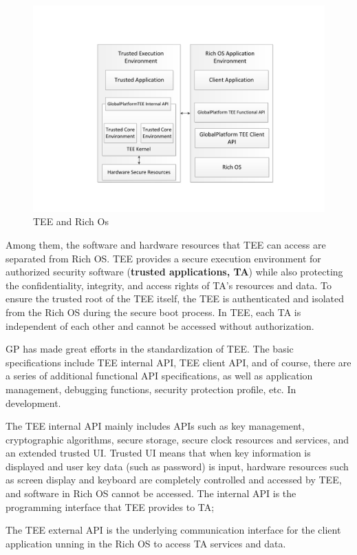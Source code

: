 \documentclass[journal]{IEEEtran}
\begin{document}
\begin{figure}[htbp]
\centerline{\includegraphics[scale=0.5]{TEE.pdf}}
\caption{TEE and Rich Os}
\label{fig}
\end{figure}

Among them, the software and hardware resources that TEE can access are separated from Rich OS. TEE provides a secure execution environment for authorized security software (\textbf{trusted applications, TA}) while also protecting the confidentiality, integrity, and access rights of TA's resources and data. To ensure the trusted root of the TEE itself, the TEE is authenticated and isolated from the Rich OS during the secure boot process. In TEE, each TA is independent of each other and cannot be accessed without authorization.

GP has made great efforts in the standardization of TEE. The basic specifications include TEE internal API, TEE client API, and of course, there are a series of additional functional API specifications, as well as application management, debugging functions, security protection profile, etc. In development.

The TEE internal API mainly includes APIs such as key management, cryptographic algorithms, secure storage, secure clock resources and services, and an extended trusted UI. Trusted UI means that when key information is displayed and user key data (such as password) is input, hardware resources such as screen display and keyboard are completely controlled and accessed by TEE, and software in Rich OS cannot be accessed. The internal API is the programming interface that TEE provides to TA;

The TEE external API is the underlying communication interface for the client application  unning in the Rich OS to access TA services and data.
\end{document}
